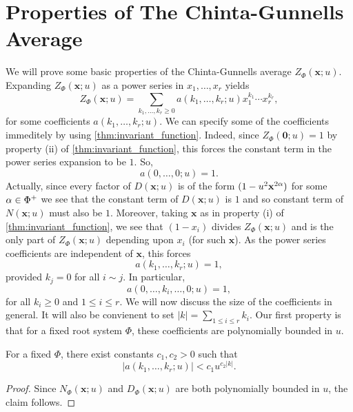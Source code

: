 \documentclass[12pt,reqno,oneside]{amsart}
\begin{document}
\section{Properties of The Chinta-Gunnells Average}
    We will prove some basic properties of the Chinta-Gunnells average $Z_{\Phi}(\mathbf{x};u)$. Expanding $Z_{\Phi}(\mathbf{x};u)$ as a power series in $x_{1},\ldots,x_{r}$ yields
    \[
        Z_{\Phi}(\mathbf{x};u) = \sum_{k_{1},\ldots,k_{r} \ge 0}a(k_{1},\ldots,k_{r};u)x_{1}^{k_{1}} \cdots x_{r}^{k_{r}},
    \]
    for some coefficients $a(k_{1},\ldots,k_{r};u)$. We can specify some of the coefficients immeditely by using \cref{thm:invariant_function}. Indeed, since $Z_{\Phi}(\mathbf{0};u) = 1$ by property (ii) of \cref{thm:invariant_function}, this forces the constant term in the power series expansion to be $1$. So,
    \[
        a(0,\ldots,0;u) = 1.
    \]
    Actually, since every factor of $D(\mathbf{x};u)$ is of the form $(1-u^{2}\mathbf{x}^{2\alpha})$ for some $\alpha \in \Phi^{+}$ we see that the constant term of $D(\mathbf{x};u)$ is $1$ and so constant term of $N(\mathbf{x};u)$ must also be $1$. Moreover, taking $\mathbf{x}$ as in property (i) of \cref{thm:invariant_function}, we see that $(1-x_{i})$ divides $Z_{\Phi}(\mathbf{x};u)$ and is the only part of $Z_{\Phi}(\mathbf{x};u)$ depending upon $x_{i}$ (for such $\mathbf{x}$). As the power series coefficients are independent of $\mathbf{x}$, this forces
    \[
        a(k_{1},\ldots,k_{r};u) = 1,
    \]
    provided $k_{j} = 0$ for all $i \sim j$. In particular,
    \[
        a(0,\ldots,k_{i},\ldots,0;u) = 1,
    \]
    for all $k_{i} \ge 0$ and $1 \le i \le r$. We will now discuss the size of the coefficients in general. It will also be convienent to set $|k| = \sum_{1 \le i \le r}k_{i}$. Our first property is that for a fixed root system $\Phi$, these coefficients are polynomially bounded in $u$.

    \begin{proposition}\label{prop:CG_coefficients_polynomial_bound}
        For a fixed $\Phi$, there exist constants $c_{1},c_{2} > 0$ such that
        \[
            |a(k_{1},\ldots,k_{r};u)| < c_{1}u^{c_{2}|k|}.
        \]
    \end{proposition}
    \begin{proof}
        Since $N_{\Phi}(\mathbf{x};u)$ and $D_{\Phi}(\mathbf{x};u)$ are both polynomially bounded in $u$, the claim follows.
    \end{proof}
\end{document}
